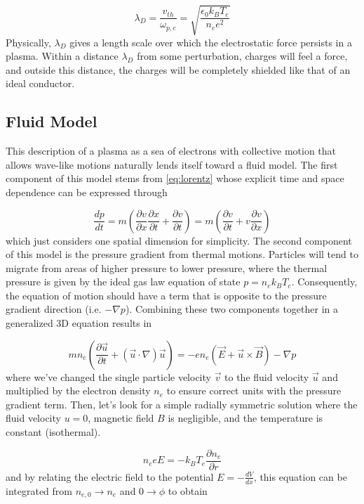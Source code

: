 \begin{equation}
	\lambda_D = \frac{v_{th}}{\omega_{p,e}} = \sqrt{\frac{\epsilon_0 k_B T_e}{n_e e^2}} \label{eq:debye}
\end{equation} 
Physically, $\lambda_D$ gives a length scale over which the electrostatic force persists in a plasma. Within a distance $\lambda_D$ from some perturbation, charges will feel a force, and outside this distance, the charges will be completely shielded like that of an ideal conductor. 

\subsection{Fluid Model}
This description of a plasma as a sea of electrons with collective motion that allows wave-like motions naturally lends itself toward a fluid model. The first component of this model stems from \cref{eq:lorentz} whose explicit time and space dependence can be expressed through

\begin{equation}
\frac{d p}{d t} = m (\frac{\partial v}{\partial x} \frac{\partial x}{\partial t} + \frac{\partial v}{\partial t}) = m (\frac{\partial v}{\partial t} + v \frac{\partial v}{\partial x})
\end{equation}
which just considers one spatial dimension for simplicity. The second component of this model is the pressure gradient from thermal motions. Particles will tend to migrate from areas of higher pressure to lower pressure, where the thermal pressure is given by the ideal gas law equation of state $p = n_e k_B T_e$. Consequently, the equation of motion should have a term that is opposite to the pressure gradient direction (i.e. $- \nabla p$). Combining these two components together in a generalized 3D equation results in

\begin{equation}
	m n_e (\frac{\partial \vec{u}}{\partial t} + (\vec{u} \cdot \nabla) \vec{u}) = -e n_e (\vec{E} + \vec{u} \times \vec{B}) - \nabla p \label{eq:fluid}
\end{equation}
where we've changed the single particle velocity $\vec{v}$ to the fluid velocity $\vec{u}$ and multiplied by the electron density $n_e$ to ensure correct units with the pressure gradient term. Then, let's look for a simple radially symmetric solution where the fluid velocity $u = 0$, magnetic field $B$ is negligible, and the temperature is constant (isothermal).

\begin{equation}
	n_e e E = - k_B T_e \frac{\partial n_e}{\partial r}
\end{equation}
and by relating the electric field to the potential $E = - \frac{dV}{dx}$, this equation can be integrated from $n_{e,0} \rightarrow n_e$ and $0 \rightarrow \phi$ to obtain 


